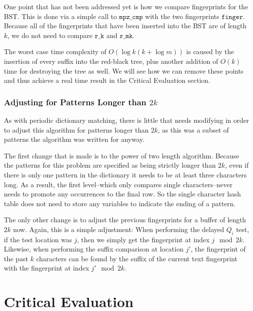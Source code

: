 \documentclass[ %
                    author={Dominic Joseph Moylett},
                    degree={MEng},
                     title={Dictionary Matching with Fingerprints},
                  subtitle={An Empirical Analysis},
                      type={Research},
                      year={2014} ]{dissertation}
\begin{document}
One point that has not been addressed yet is how we compare fingerprints for the BST. This is done via a simple call to $\texttt{mpz\_cmp}$ with the two fingerprints $\texttt{finger}$. Because all of the fingerprints that have been inserted into the BST are of length $k$, we do not need to compare $\texttt{r\_k}$ and $\texttt{r\_mk}$.

The worst case time complexity of $O(\log k(k + \log m))$ is caused by the insertion of every suffix into the red-black tree, plus another addition of $O(k)$ time for destroying the tree as well. We will see how we can remove these points and thus achieve a real time result in the Critical Evaluation section.

\subsection{Adjusting for Patterns Longer than $2k$}

As with periodic dictionary matching, there is little that needs modifying in order to adjust this algorithm for patterns longer than $2k$, as this was a subset of patterns the algorithm was written for anyway.

The first change that is made is to the power of two length algorithm. Because the patterns for this problem are specified as being strictly longer than $2k$, even if there is only one pattern in the dictionary it needs to be at least three characters long. As a result, the first level--which only compares single characters--never needs to promote any occurrences to the final row. So the single character hash table does not need to store any variables to indicate the ending of a pattern.

The only other change is to adjust the previous fingerprints for a buffer of length $2k$ now. Again, this is a simple adjustment: When performing the delayed $Q_i$ test, if the test location was $j$, then we simply get the fingerprint at index $j \mod 2k$. Likewise, when performing the suffix comparison at location $j'$, the fingerprint of the past $k$ characters can be found by the suffix of the current text fingerprint with the fingerprint at index $j' \mod 2k$.


\chapter{Critical Evaluation}
\label{chap:evaluation}
\end{document}
